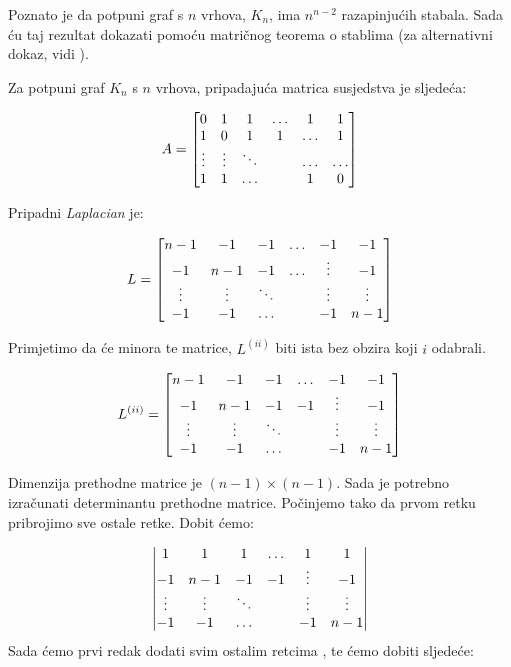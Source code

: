 \documentclass[times, utf8, zavrsni]{fer}
\begin{document}
Poznato je da potpuni graf s $n$ vrhova, $K_n$, ima $n^{n-2}$ razapinjućih stabala. Sada ću taj rezultat dokazati pomoću matričnog teorema o stablima (za alternativni dokaz, vidi \cite{KKNP}).

Za potpuni graf $K_n$ s $n$ vrhova, pripadajuća matrica susjedstva je sljedeća:

\[
\centering
A = 
\begin{bmatrix}
	0 & 1 & 1 & \ldots & 1 & 1 \\
	1 & 0 & 1 & 1 & \ldots & 1 \\
	\vdots & \vdots & \ddots & & \ldots & \ldots  \\
	1 & 1 & \ldots & & 1 & 0
\end{bmatrix}
\]

Pripadni \textit{Laplacian} je:

\[
\centering
L = 
\begin{bmatrix}
	n-1 & -1 & -1 & \ldots & -1 & -1 \\
	-1 & n-1 & -1 & \ldots & \vdots & -1 \\
	\vdots & \vdots & \ddots & & \vdots & \vdots \\
	-1 & -1 & \ldots & & -1 & n-1
\end{bmatrix}
\]

Primjetimo da će minora te matrice, $L^{(ii)}$ biti ista bez obzira koji $i$ odabrali.

\[
\centering
L^{(ii)} = 
\begin{bmatrix}
	n-1 & -1 & -1 & \ldots & -1 & -1 \\
	-1 & n-1 & -1 & -1 & \vdots & -1 \\
	\vdots & \vdots & \ddots & & \vdots & \vdots  \\
	-1 & -1 & \ldots & & -1 & n-1
\end{bmatrix}
\]

Dimenzija prethodne matrice je $(n-1) \times (n-1)$. Sada je potrebno izračunati determinantu prethodne matrice. Počinjemo tako da prvom retku pribrojimo sve ostale retke. Dobit ćemo:
 
 \[
	\centering
	\left|
	\begin{matrix}
		1 & 1 & 1 & \ldots & 1 & 1 \\
		-1 & n-1 & -1 & -1 & \vdots & -1 \\
		\vdots & \vdots & \ddots & & \vdots & \vdots  \\
		-1 & -1 & \ldots & & -1 & n-1
	\end{matrix}
	\right|
\]
Sada ćemo prvi redak dodati svim ostalim retcima , te ćemo dobiti sljedeće:
\end{document}

